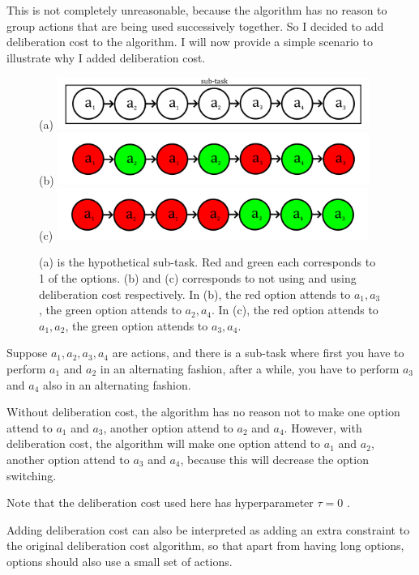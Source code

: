 \documentclass{article}
\begin{document}
	\quad This is not completely unreasonable, because the algorithm has no reason to group actions that are being used successively together. So I decided to add deliberation cost to the algorithm. I will now provide a simple scenario to illustrate why I added deliberation cost.
	\begin{figure}[h]
	\centering
	\small{(a)}
	\includegraphics[width=4in]{actionSeq.png}\\
	\small{(b)}
	\includegraphics[width=4in]{actionSeqB.png}\\
	\small{(c)}
	\includegraphics[width=4in]{actionSeqG.png}
	\caption{(a) is the hypothetical sub-task. Red and green each corresponds to 1 of the options. (b) and (c) corresponds to not using and using deliberation cost respectively. In (b), the red option attends to $a_1,a_3$, the green option attends to $a_2,a_4$. In (c), the red option attends to $a_1,a_2$, the green option attends to $a_3,a_4$.}
	\end{figure}
	
	\quad Suppose $a_1, a_2, a_3, a_4$ are actions, and there is a sub-task where first you have to perform $a_1$ and $a_2$ in an alternating fashion, after a while, you have to perform $a_3$ and $a_4$ also in an alternating fashion.
	
	\quad Without deliberation cost, the algorithm has no reason not to make one option attend to $a_1$ and $a_3$, another option attend to $a_2$ and $a_4$. However, with deliberation cost, the algorithm will make one option attend to $a_1$ and $a_2$, another option attend to $a_3$ and $a_4$, because this will decrease the option switching.

	\quad Note that the deliberation cost used here has hyperparameter $\tau = 0$ \cite{harb2017waiting}.
	
	\quad Adding deliberation cost can also be interpreted as adding an extra constraint to the original deliberation cost algorithm, so that apart from having long options, options should also use a small set of actions.
\end{document}
